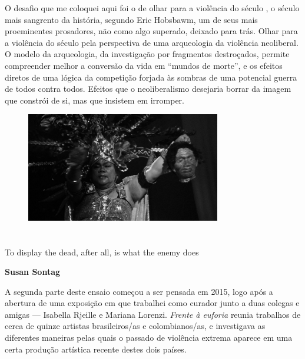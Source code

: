 \asterisc

O desafio que me coloquei aqui foi o de olhar para a violência do século , o século mais sangrento
da história, segundo Eric Hobsbawm, um de seus mais proeminentes
prosadores, não como algo superado, deixado para trás. Olhar para a
violência do século  pela perspectiva de uma arqueologia da violência
neoliberal. O modelo da arqueologia, da investigação por fragmentos
destroçados, permite compreender melhor a conversão da vida em ``mundos
de morte'', e os efeitos diretos de uma lógica da competição forjada às
sombras de uma potencial guerra de todos contra todos. Efeitos que o neoliberalismo
desejaria borrar da imagem que constrói de
si, mas que insistem em irromper.

\pagebreak
\thispagestyle{empty}

\begin{vplace}[.6]
\begin{figure}[!ht]
\centering
 \includegraphics[width=85mm]{./imgs/frame2.jpg}
\caption{\tiny{}}
\end{figure}
\end{vplace}

\pagebreak

\section*{}

\epigraph{\Formular\scriptsize{To display the dead, after all, is what the enemy does}}{\Formular\scriptsize\textbf{Susan Sontag}}

A segunda parte deste ensaio começou a ser pensada em 2015, logo após a
abertura de uma exposição em que trabalhei como curador junto a duas
colegas e amigas --- Isabella Rjeille e Mariana Lorenzi. \emph{Frente à
euforia} reunia trabalhos de cerca de quinze artistas brasileiros/as e
colombianos/as, e investigava as diferentes maneiras pelas
quais o passado de violência extrema aparece em uma certa produção artística
recente destes dois países.

